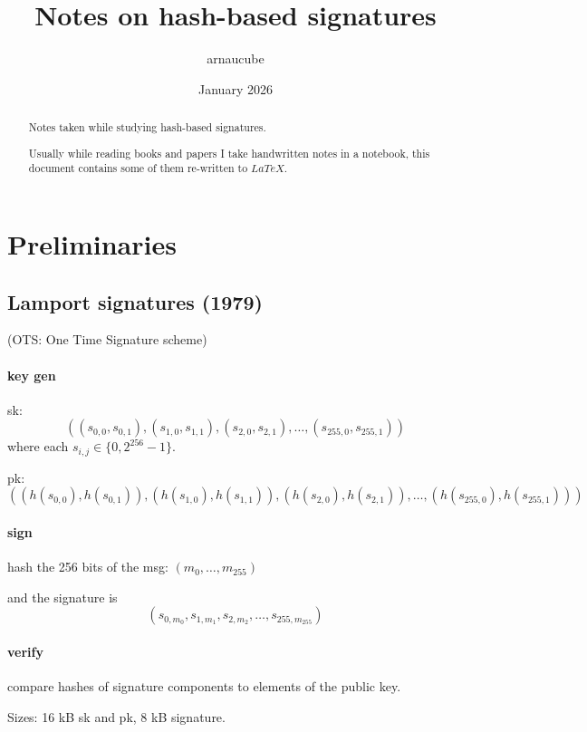 \documentclass{article}
\title{Notes on hash-based signatures}
\author{arnaucube}
\date{January 2026}
\theoremstyle{definition}
\begin{document}
\maketitle

\begin{abstract}
    Notes taken while studying hash-based signatures.

    Usually while reading books and papers I take handwritten notes in a notebook, this document contains some of them re-written to $LaTeX$.
\end{abstract}

\tableofcontents

\vspace{1.0cm}

\section{Preliminaries}
\subsection{Lamport signatures (1979)}
(OTS: One Time Signature scheme)

\paragraph{key gen}

sk:
$$((s_{0,0}, s_{0,1}), (s_{1,0}, s_{1,1}), (s_{2,0}, s_{2,1}), \ldots, (s_{255,0}, s_{255,1}))$$
where each $s_{i,j} \in \{0, 2^256 -1\}$.

pk:
$$((h(s_{0,0}), h(s_{0,1})), (h(s_{1,0}), h(s_{1,1})), (h(s_{2,0}), h(s_{2,1})), \ldots, (h(s_{255,0}), h(s_{255,1})))$$

\paragraph{sign}
hash the 256 bits of the msg: $(m_0, \ldots, m_{255})$

and the signature is
$$(s_{0, m_0}, s_{1, m_1}, s_{2, m_2}, \ldots, s_{255, m_{255}})$$

\paragraph{verify}
compare hashes of signature components to elements of the public key.

\vspace{0.5cm}
Sizes: 16 kB sk and pk, 8 kB signature.
\end{document}
